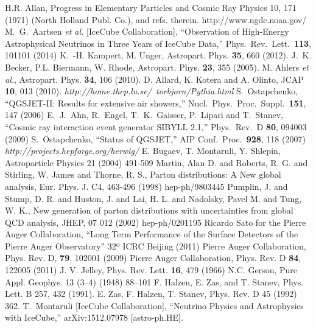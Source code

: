 \begin{thebibliography}{1}
 H.R. Allan, Progress in Elementary Particles and Cosmic Ray Physics 10, 171 (1971) (North Holland Publ. Co.), and refs. therein.
 http://www.ngdc.noaa.gov/
 M.~G.~Aartsen {\it et al.} [IceCube Collaboration], ``Observation of High-Energy Astrophysical Neutrinos in Three Years of IceCube Data,'' Phys.\ Rev.\ Lett.\  {\bf 113}, 101101 (2014)
 K.~-H. Kampert, M. Unger, Astropart. Phys. {\bf 35}, 660 (2012).  
 J.~K. Becker, P.L. Biermann, W. Rhode, Astropart. Phys. {\bf 23}, 355 (2005).
 M. Ahlers {\it et al.}, Astropart. Phys. {\bf 34}, 106 (2010).
 D. Allard, K. Kotera and A. Olinto, JCAP {\bf 10}, 013 (2010).
 \emph{http://home.thep.lu.se/~torbjorn/Pythia.html}
 S.~Ostapchenko, ``QGSJET-II: Results for extensive air showers,'' Nucl.\ Phys.\ Proc.\ Suppl.\  {\bf 151}, 147 (2006)
  E.~J.~Ahn, R.~Engel, T.~K.~Gaisser, P.~Lipari and T.~Stanev, ``Cosmic ray interaction event generator SIBYLL 2.1,'' Phys.\ Rev.\ D {\bf 80}, 094003 (2009)
 S.~Ostapchenko, ``Status of QGSJET,'' AIP Conf.\ Proc.\  {\bf 928}, 118 (2007)
 \emph{http://projects.hepforge.org/herwig/}
 E. Bugaev, T. Montaruli, Y. Shlepin, Astroparticle Physics 21 (2004) 491-509
 Martin, Alan D. and Roberts, R. G. and Stirling, W. James and Thorne, R. S., Parton distributions: A New global analysis, Eur. Phys. J. C4, 463-496 (1998) hep-ph/9803445
 Pumplin, J. and Stump, D. R. and Huston, J. and Lai, H. L. and Nadolsky, Pavel M. and Tung, W. K., New generation of parton distributions with uncertainties from global QCD analysis, JHEP, 07 012 (2002) hep-ph/0201195
 Ricardo Sato for the Pierre Auger Collaboration, ``Long Term Performance of the Surface Detectors of the Pierre Auger Observatory'' 32º ICRC Beijing (2011)
 Pierre Auger Collaboration, Phys. Rev. D, \textbf{79}, 102001 (2009)
 Pierre Auger Collaboration, Phys. Rev. D \textbf{84}, 122005 (2011)
  J. V. Jelley, Phys. Rev. Lett. \textbf{16}, 479 (1966)
 N.C. Gerson, Pure Appl. Geophys. 13 (3–4) (1948) 88–101
F. Halzen, E. Zas, and T. Stanev, Phys. Lett. B 257, 432 (1991).
 E. Zas, F. Halzen, T. Stanev, Phys. Rev. D 45 (1992) 362.
 T.~Montaruli [IceCube Collaboration], ``Neutrino Physics and Astrophysics with IceCube,'' arXiv:1512.07978 [astro-ph.HE].

\end{thebibliography}
